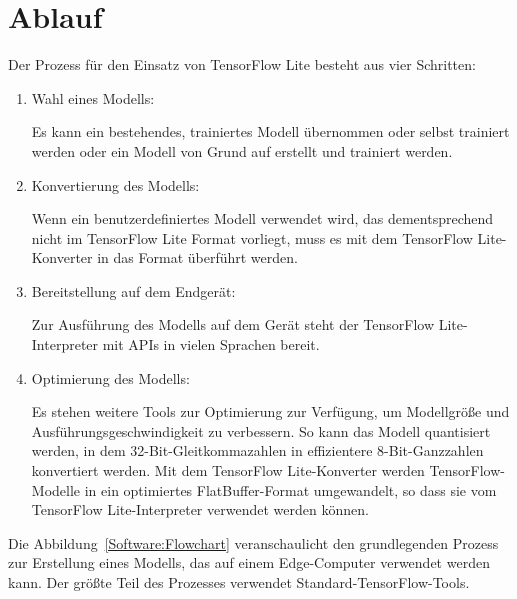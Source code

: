 \section{Ablauf}
 
Der Prozess für den Einsatz von TensorFlow Lite besteht aus vier Schritten:
 
\begin{enumerate}
  \item Wahl eines Modells:
 
      Es kann ein bestehendes, trainiertes Modell übernommen oder selbst trainiert werden oder ein Modell von Grund auf erstellt und trainiert werden.
  \item Konvertierung des Modells:

        Wenn ein benutzerdefiniertes Modell verwendet wird, das dementsprechend nicht im TensorFlow Lite Format vorliegt, muss es mit dem  TensorFlow Lite-Konverter in das Format überführt werden.
  \item Bereitstellung auf dem Endgerät:
  
        Zur Ausführung des Modells auf dem Gerät steht der TensorFlow Lite-Interpreter mit APIs in vielen Sprachen bereit.

 \item Optimierung des Modells:
 
       Es stehen weitere Tools zur Optimierung zur Verfügung, um Modellgröße und Ausführungsgeschwindigkeit zu verbessern. So kann das Modell quantisiert werden, in dem 32-Bit-Gleitkommazahlen in effizientere 8-Bit-Ganzzahlen konvertiert werden. Mit dem TensorFlow Lite-Konverter werden TensorFlow-Modelle in ein optimiertes FlatBuffer-Format umgewandelt, so dass sie vom TensorFlow Lite-Interpreter verwendet werden können. \cite{GoogleTensorFlowLite:2019}       
\end{enumerate}


Die Abbildung~\ref{Software:Flowchart} veranschaulicht den grundlegenden Prozess zur Erstellung eines Modells, das auf einem Edge-Computer verwendet werden kann. Der größte Teil des Prozesses verwendet Standard-TensorFlow-Tools. 

